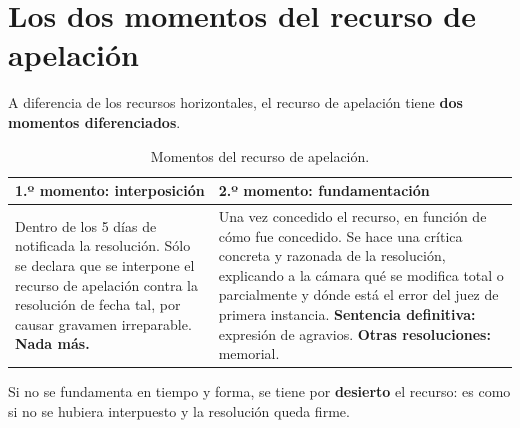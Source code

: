 \documentclass[12pt,oneside]{book}
\begin{document}
\section{Los dos momentos del recurso de apelación}

A diferencia de los recursos horizontales, el recurso de apelación tiene \textbf{dos momentos diferenciados}.

\begin{table}[H]
\centering
\begin{tabularx}{\textwidth}{
    >{\raggedright\arraybackslash}X
    >{\raggedright\arraybackslash}X
}
\toprule
\textbf{1.º momento: interposición} & \textbf{2.º momento: fundamentación} \\
\midrule
Dentro de los 5 días de notificada la resolución. Sólo se declara que se interpone el recurso de apelación contra la resolución de fecha tal, por causar gravamen irreparable. \textbf{Nada más.} &
Una vez concedido el recurso, en función de cómo fue concedido. Se hace una crítica concreta y razonada de la resolución, explicando a la cámara qué se modifica total o parcialmente y dónde está el error del juez de primera instancia. \newline
\textbf{Sentencia definitiva:} expresión de agravios. \newline
\textbf{Otras resoluciones:} memorial. \\
\bottomrule
\end{tabularx}
\caption{Momentos del recurso de apelación.}
\end{table}

\begin{important}
Si no se fundamenta en tiempo y forma, se tiene por \textbf{desierto} el recurso: es como si no se hubiera interpuesto y la resolución queda firme.
\end{important}
\end{document}
